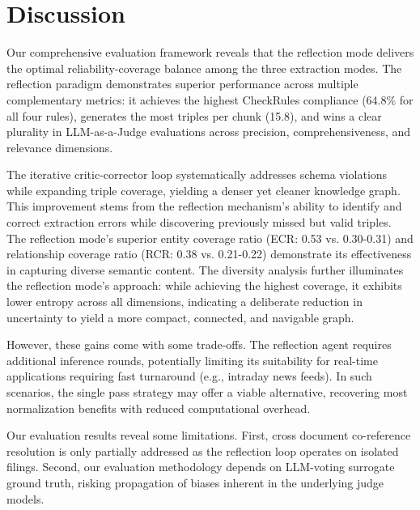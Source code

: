 \section{Discussion}

Our comprehensive evaluation framework reveals that the reflection mode delivers the optimal reliability-coverage balance among the three extraction modes. The reflection paradigm demonstrates superior performance across multiple complementary metrics: it achieves the highest CheckRules compliance (64.8\% for all four rules), generates the most triples per chunk (15.8), and wins a clear plurality in LLM-as-a-Judge evaluations across precision, comprehensiveness, and relevance dimensions.

The iterative critic-corrector loop systematically addresses schema violations while expanding triple coverage, yielding a denser yet cleaner knowledge graph. This improvement stems from the reflection mechanism's ability to identify and correct extraction errors while discovering previously missed but valid triples. The reflection mode's superior entity coverage ratio (ECR: 0.53 vs. 0.30-0.31) and relationship coverage ratio (RCR: 0.38 vs. 0.21-0.22) demonstrate its effectiveness in capturing diverse semantic content. The diversity analysis further illuminates the reflection mode's approach: while achieving the highest coverage, it exhibits lower entropy across all dimensions, indicating a deliberate reduction in uncertainty to yield a more compact, connected, and navigable graph.

However, these gains come with some trade-offs. The reflection agent requires additional inference rounds, potentially limiting its suitability for real-time applications requiring fast turnaround (e.g., intraday news feeds). In such scenarios, the single pass strategy may offer a viable alternative, recovering most normalization benefits with reduced computational overhead.

Our evaluation results reveal some limitations. First, cross document co-reference resolution is only partially addressed as the reflection loop operates on isolated filings. Second, our evaluation methodology depends on LLM-voting surrogate ground truth, risking propagation of biases inherent in the underlying judge models. 